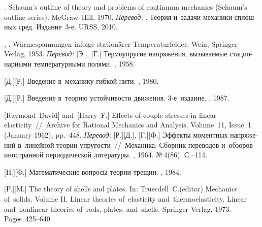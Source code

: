 \begin{thebibliography}{123}
\begin{otherlanguage}{russian}
.
Schaum’s outline of theory and problems of continuum mechanics
(Schaum’s outline series).
McGraw\hbox{--}Hill,
1970.
\emph{Перевод:}
.
Теория и~задачи механики сплошных сред.
Издание~3\hbox{-}е.
URSS, 2010.


, . Wärmespannungen infolge stationärer Temperaturfelder. Wein, Springer-Verlag, 1953. 
\emph{Перевод:} [Э.], [Г.] Термоупругие напряжения, вызываемые стационарными температурными полями. \fizmatgiz, 1958. 

[Д.][Р.] Введение в~механику гибкой нити. \naukapublisher, 1980. 

[Д.][Р.] Введение в~теорию устойчивости движения. 3\hbox{-}е~издание. \naukapublisher, 1987. 

[Raymond~David] %
and~[Harry~F.] %
Effects of couple-stresses in linear elasticity~//~Archive for Rational Mechanics and Analysis. Volume~11, Issue~1 (January 1962), pp.\hbox{--}448.
\emph{Перевод:}
[Р.][Д.], [Г.][Ф.]
Эффекты моментных напряжений в~линейной теории упругости~//~Механика: Сборник переводов и~обзоров иностранной периодической литературы. \mirpublisher, 1964. №\,4\:(86). С.\hbox{--}114.

[Н.][Ф.] Математические вопросы теории трещин. \naukapublisher, 1984. 

[P.][M.] The theory of shells and plates. In: Truesdell~C.\:(editor) Mechanics of~solids. Volume II. Linear theories of~elasticity and~thermoelasticity. Linear and~nonlinear theories of~rods, plates, and~shells. Springer\hbox{-}Verlag, 1973. Pages~425\hbox{--}640.


\end{otherlanguage}
\end{thebibliography}
